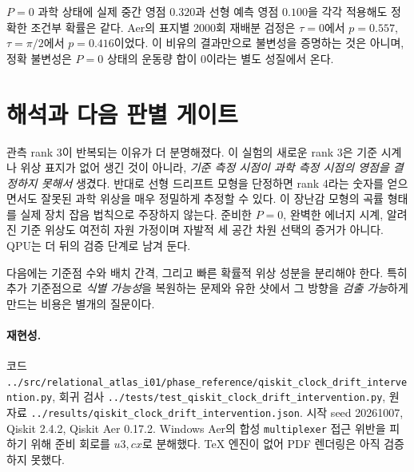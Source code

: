 \documentclass[11pt,a4paper]{article}
\begin{document}
$P=0$ 과학 상태에 실제 중간 영점 $0.320$과 선형 예측 영점 $0.100$을
각각 적용해도 정확한 조건부 확률은 같다. Aer의 표지별 2000회 재배분
검정은 $\tau=0$에서 $p=0.557$, $\tau=\pi/2$에서 $p=0.416$이었다.
이 비유의 결과만으로 불변성을 증명하는 것은 아니며, 정확 불변성은
$P=0$ 상태의 운동량 합이 0이라는 별도 성질에서 온다.

\section{해석과 다음 판별 게이트}
관측 rank 3이 반복되는 이유가 더 분명해졌다. 이 실험의 새로운
rank 3은 기준 시계나 위상 표지가 없어 생긴 것이 아니라,
\emph{기준 측정 시점이 과학 측정 시점의 영점을 결정하지 못해서}
생겼다. 반대로 선형 드리프트 모형을 단정하면 rank 4라는 숫자를
얻으면서도 잘못된 과학 위상을 매우 정밀하게 추정할 수 있다.
이 장난감 모형의 곡률 형태를 실제 장치 잡음 법칙으로 주장하지 않는다.
준비한 $P=0$, 완벽한 에너지 시계, 알려진 기준 위상도 여전히 자원
가정이며 자발적 세 공간 차원 선택의 증거가 아니다. QPU는 더 뒤의
검증 단계로 남겨 둔다.

다음에는 기준점 수와 배치 간격, 그리고 빠른 확률적 위상 성분을
분리해야 한다. 특히 추가 기준점으로 \emph{식별 가능성}을 복원하는
문제와 유한 샷에서 그 방향을 \emph{검출 가능}하게 만드는 비용은
별개의 질문이다.

\paragraph{재현성.} 코드
\texttt{../src/relational\_atlas\_i01/phase\_reference/qiskit\_clock\_drift\_intervention.py}, 회귀 검사
\texttt{../tests/test\_qiskit\_clock\_drift\_intervention.py}, 원자료
\texttt{../results/qiskit\_clock\_drift\_intervention.json}.
시작 seed 20261007, Qiskit 2.4.2, Qiskit Aer 0.17.2.
Windows Aer의 합성 \texttt{multiplexer} 접근 위반을 피하기 위해
준비 회로를 $u3,cx$로 분해했다. TeX 엔진이 없어 PDF 렌더링은
아직 검증하지 못했다.
\end{document}
